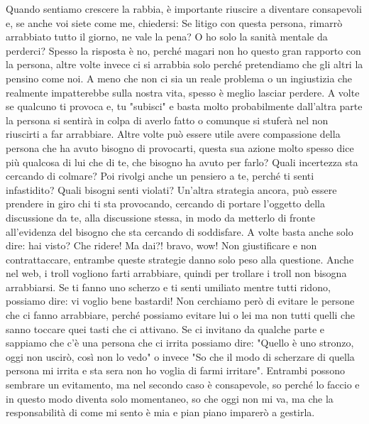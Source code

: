 \documentclass[12pt]{book} %
\begin{document}
Quando sentiamo crescere la rabbia, è importante riuscire a diventare consapevoli e, se anche voi siete come me, chiedersi:
Se litigo con questa persona, rimarrò arrabbiato tutto il giorno, ne vale la pena? O ho solo la sanità mentale da perderci?
Spesso la risposta è no, perché magari non ho questo gran rapporto con la persona, altre volte invece ci si arrabbia solo perché pretendiamo che gli altri la pensino come noi. A meno che non ci sia un reale problema o un ingiustizia che realmente impatterebbe sulla nostra vita, spesso è meglio lasciar perdere. 
A volte se qualcuno ti provoca e, tu "subisci" e basta molto probabilmente dall'altra parte la persona si sentirà in colpa di averlo fatto o comunque si stuferà nel non riuscirti a far arrabbiare. Altre volte può essere utile avere compassione della persona che ha avuto bisogno di provocarti, questa sua azione molto spesso dice più qualcosa di lui che di te, che bisogno ha avuto per farlo? Quali incertezza sta cercando di colmare? Poi rivolgi anche un pensiero a te, perché ti senti infastidito? Quali bisogni senti violati?
Un'altra strategia ancora, può essere prendere in giro chi ti sta provocando, cercando di portare l'oggetto della discussione da te, alla discussione stessa, in modo da metterlo di fronte all'evidenza del bisogno che sta cercando di soddisfare. A volte basta anche solo dire: \newline
hai visto? Che ridere! \newline
Ma dai?! bravo, wow! \newline
Non giustificare e non contrattaccare, entrambe queste strategie danno solo peso alla questione.
Anche nel web, i troll vogliono farti arrabbiare, quindi per trollare i troll non bisogna arrabbiarsi.
Se ti fanno uno scherzo e ti senti umiliato mentre tutti ridono, possiamo dire: vi voglio bene bastardi!
Non cerchiamo però di evitare le persone che ci fanno arrabbiare, perché possiamo evitare lui o lei ma non tutti quelli che sanno toccare quei tasti che ci attivano. Se ci invitano da qualche parte e sappiamo che c'è una persona che ci irrita possiamo dire: "Quello è uno stronzo, oggi non uscirò, così non lo vedo" o invece "So che il modo di scherzare di quella persona mi irrita e sta sera non ho voglia di farmi irritare". Entrambi possono sembrare un evitamento, ma nel secondo caso è consapevole, so perché lo faccio e in questo modo diventa solo momentaneo, so che oggi non mi va, ma che la responsabilità di come mi sento è mia e pian piano imparerò a gestirla.
\end{document}
